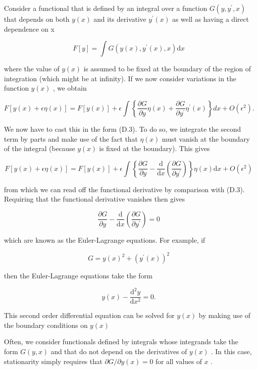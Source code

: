 \documentclass[
  10
]{article}
\begin{document}
Consider a functional that is defined by an integral over a function
\(G ( y , y ^ { \prime } , x )\) that depends on both \(y ( x )\) and
its derivative \(y ^ { \prime } ( x )\) as well as having a direct
dependence on x

\[
F [ y ] = \int G (y (x), y ^ {\prime} (x), x) \mathrm{d} x\tag{D.5}
\]

where the value of \(y ( x )\) is assumed to be fixed at the boundary of
the region of integration (which might be at infinity). If we now
consider variations in the function \(y ( x )\) , we obtain

\[
F [ y (x) + \epsilon \eta (x) ] = F [ y (x) ] + \epsilon \int \left\{\frac {\partial G}{\partial y} \eta (x) + \frac {\partial G}{\partial y ^ {\prime}} \eta^ {\prime} (x) \right\} d x + O (\epsilon^ {2}).\tag{D.6}
\]

We now have to cast this in the form (D.3). To do so, we integrate the
second term by parts and make use of the fact that \(\eta ( x )\) must
vanish at the boundary of the integral (because \(y ( x )\) is fixed at
the boundary). This gives

\[
F [ y (x) + \epsilon \eta (x) ] = F [ y (x) ] + \epsilon \int \left\{\frac {\partial G}{\partial y} - \frac {\mathrm{d}}{\mathrm{d} x} \left(\frac {\partial G}{\partial y ^ {\prime}}\right) \right\} \eta (x) \mathrm{d} x + O (\epsilon^ {2})\tag{D.7}
\]

from which we can read off the functional derivative by comparison with
(D.3). Requiring that the functional derivative vanishes then gives

\[
\frac {\partial G}{\partial y} - \frac {\mathrm{d}}{\mathrm{d} x} \left(\frac {\partial G}{\partial y ^ {\prime}}\right) = 0\tag{D.8}
\]

which are known as the Euler-Lagrange equations. For example, if

\[
G = y (x) ^ {2} + \left(y ^ {\prime} (x)\right) ^ {2}\tag{D.9}
\]

then the Euler-Lagrange equations take the form

\[
y (x) - \frac {\mathrm{d} ^ {2} y}{\mathrm{d} x ^ {2}} = 0.\tag{D.10}
\]

This second order differential equation can be solved for \(y ( x )\) by
making use of the boundary conditions on \(y ( x )\)

Often, we consider functionals defined by integrals whose integrands
take the form \(G ( y , x )\) and that do not depend on the derivatives
of \(y ( x )\) . In this case, stationarity simply requires that
\(\partial G / \partial y ( x ) = 0\) for all values of \(x\) .
\end{document}
